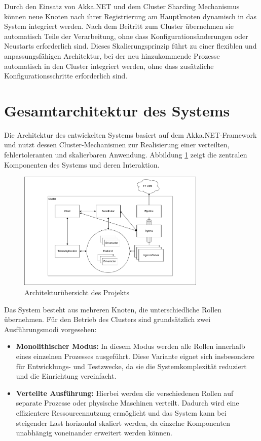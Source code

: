 Durch den Einsatz von Akka.NET und dem Cluster Sharding Mechanismus 
können neue Knoten nach ihrer Registrierung am Hauptknoten dynamisch in das System integriert werden. 
Nach dem Beitritt zum Cluster übernehmen sie automatisch Teile der Verarbeitung, 
ohne dass Konfigurationsänderungen oder Neustarts erforderlich sind.
Dieses Skalierungsprinzip führt zu einer flexiblen und anpassungsfähigen Architektur,
bei der neu hinzukommende Prozesse automatisch in den Cluster integriert werden,
ohne dass zusätzliche Konfigurationsschritte erforderlich sind.

\section{Gesamtarchitektur des Systems}
Die Architektur des entwickelten Systems basiert auf dem Akka.NET-Framework und nutzt dessen 
Cluster-Mechanismen zur Realisierung einer verteilten, fehlertoleranten und skalierbaren Anwendung.
Abbildung \ref{fig:own-architecture} zeigt die zentralen Komponenten des Systems und deren Interaktion.

\begin{figure}[H]
    \centering
    \includegraphics[width=0.8\textwidth]{assets/architecture.v1.png}
    \caption{Architekturübersicht des Projekts}
    \label{fig:own-architecture}
\end{figure}

Das System besteht aus mehreren Knoten, die unterschiedliche Rollen übernehmen. Für den Betrieb 
des Clusters sind grundsätzlich zwei Ausführungsmodi vorgesehen:

\begin{itemize}
    \item \textbf{Monolithischer Modus:} 
    In diesem Modus werden alle Rollen innerhalb eines einzelnen Prozesses ausgeführt.
    Diese Variante eignet sich insbesondere für Entwicklungs- und Testzwecke, da sie die Systemkomplexität 
    reduziert und die Einrichtung vereinfacht.
    \item \textbf{Verteilte Ausführung:} 
    Hierbei werden die verschiedenen Rollen auf separate Prozesse oder physische Maschinen verteilt.  
    Dadurch wird eine effizientere Ressourcennutzung ermöglicht und das System kann bei steigender Last 
    horizontal skaliert werden, da einzelne Komponenten unabhängig voneinander erweitert werden können.
\end{itemize}

